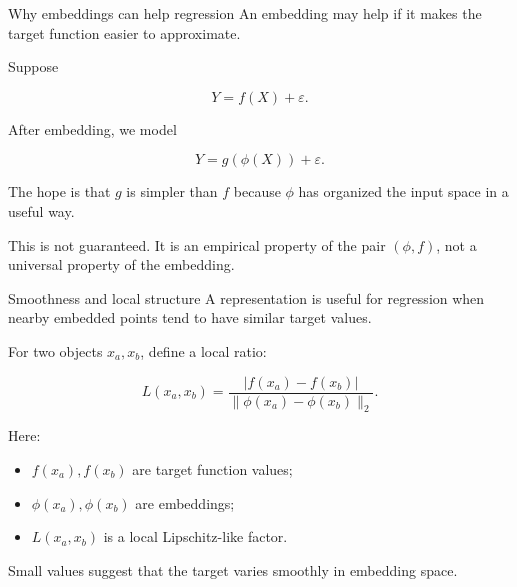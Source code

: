 \documentclass[aspectratio=169]{beamer}
\begin{document}
\begin{frame}{Why embeddings can help regression}
\large
An embedding may help if it makes the target function easier to approximate.

\vspace{0.25cm}

Suppose

\[
Y = f(X)+\varepsilon.
\]

After embedding, we model

\[
Y = g(\phi(X))+\varepsilon.
\]

\vspace{0.25cm}

The hope is that \(g\) is simpler than \(f\) because \(\phi\) has organized the input space in a useful way.

\vspace{0.25cm}

\begin{redbox}
This is not guaranteed. It is an empirical property of the pair \((\phi,f)\), not a universal property of the embedding.
\end{redbox}
\end{frame}

\begin{frame}{Smoothness and local structure}
\large
A representation is useful for regression when nearby embedded points tend to have similar target values.

\vspace{0.2cm}

For two objects \(x_a,x_b\), define a local ratio:

\[
L(x_a,x_b)
=
\frac{|f(x_a)-f(x_b)|}{\|\phi(x_a)-\phi(x_b)\|_2}.
\]

\vspace{0.2cm}

Here:
\begin{itemize}
  \item \(f(x_a),f(x_b)\) are target function values;
  \item \(\phi(x_a),\phi(x_b)\) are embeddings;
  \item \(L(x_a,x_b)\) is a local Lipschitz-like factor.
\end{itemize}

\vspace{0.2cm}

Small values suggest that the target varies smoothly in embedding space.
\end{frame}
\end{document}
